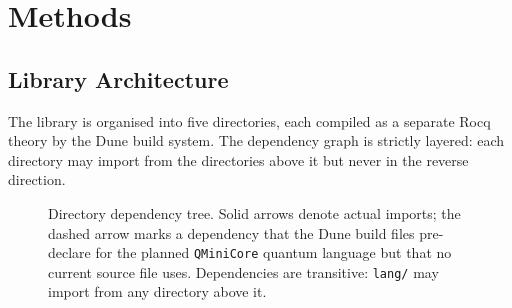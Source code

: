 
\chapter{Methods}
\label{ch:methods}

\section{Library Architecture}
\label{sec:meth-architecture}

The library is organised into five directories, each compiled as a separate
Rocq theory by the Dune build system.  The dependency graph is strictly
layered: each directory may import from the directories above it but never
in the reverse direction.

\begin{figure}[ht]
\centering
{}
\caption{Directory dependency tree.  Solid arrows denote actual imports;
  the dashed arrow marks a dependency that the Dune build files pre-declare
  for the planned \texttt{QMiniCore} quantum language but that no current
  source file uses.  Dependencies are transitive: \texttt{lang/} may
  import from any directory above it.}
\label{fig:dep-graph}
\end{figure}

